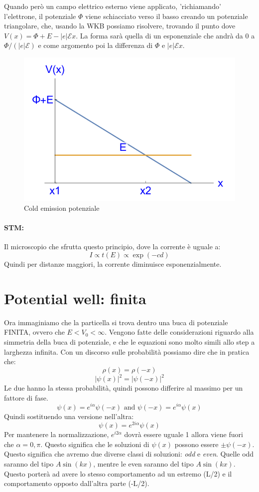 Quando però un campo elettrico esterno viene applicato, 'richiamando' l'elettrone, il potenziale $\Phi$ viene schiacciato verso il basso creando un potenziale triangolare, che, usando la WKB possiamo risolvere, trovando il punto dove $V(x) = \Phi + E - |e|\mathcal{E} x$. La forma sarà quella di un esponenziale che andrà da 0 a $\Phi / (|e|\mathcal{E})$ e come argomento poi la differenza di $\Phi$ e $|e|\mathcal{E} x$.

\begin{figure}[ht]
	\centering
	\includegraphics[width=.5\textwidth]{../images/Screenshot 2025-02-17 144752.png}
	\caption{Cold emission potenziale}
	\label{fig:stm}
\end{figure}

\paragraph{STM:}
Il microscopio che sfrutta questo principio, dove la corrente è uguale a:
$$I\propto t(E) \propto \exp(-cd)$$
Quindi per distanze maggiori, la corrente diminuisce esponenzialmente.

\section{Potential well: finita}

Ora immaginiamo che la particella si trova dentro una buca di potenziale FINITA, ovvero che $E < V_0 < \infty$. Vengono fatte delle considerazioni riguardo alla simmetria della buca di potenziale, e che le equazioni sono molto simili allo step a larghezza infinita. Con un discorso sulle probabilità possiamo dire che in pratica che:
$$\rho(x) = \rho(-x)$$
$$|\psi(x)|^2 = |\psi(-x)|^2$$
Le due hanno la stessa probabilità, quindi possono differire al massimo per un fattore di fase.
$$\psi(x) = e^{i\alpha}\psi(-x) \text{ and } \psi(-x) = e^{i\alpha}\psi(x)$$
Quindi sostituendo una versione nell'altra:
$$\psi(x) = e^{2i\alpha}\psi(x)$$
Per mantenere la normalizzazione, $e^{i2\alpha}$ dovrà essere uguale 1 allora viene fuori che $\alpha = 0, \pi$. Questo significa che le soluzioni di $\psi(x)$ possono essere $\pm\psi(-x)$. Questo significa che avremo due diverse classi di soluzioni: \textit{odd} e \textit{even}. Quelle odd saranno del tipo $A\sin(kx)$, mentre le even saranno del tipo $A\sin(kx)$. Questo porterà ad avere lo stesso comportamento ad un estremo (L/2) e il comportamento opposto dall'altra parte (-L/2).

